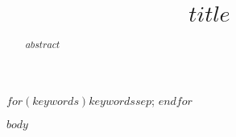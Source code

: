 \documentclass[a4paper,num-refs]{oup-contemporary}
\title{$title$}
\begin{document}
\begin{frontmatter}
\maketitle
\begin{abstract}
$abstract$
\end{abstract}

\begin{keywords}
$for(keywords)$$keywords$$sep$; $endfor$
\end{keywords}
\end{frontmatter}



$body$

\end{document}
